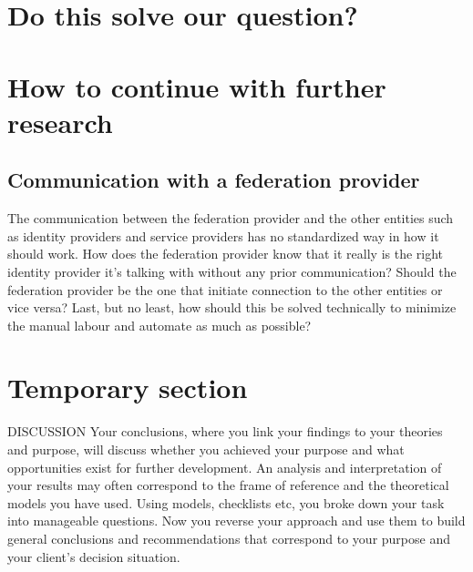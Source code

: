 \section{Do this solve our question?}

\section{How to continue with further research}
\subsection{Communication with a federation provider}
The communication between the federation provider and the other entities such as identity providers and service providers has no standardized way in how it should work.
How does the federation provider know that it really is the right identity provider it's talking with without any prior communication?
Should the federation provider be the one that initiate connection to the other entities or vice versa?
Last, but no least, how should this be solved technically to minimize the manual labour and automate as much as possible?

\section{Temporary section }
DISCUSSION Your conclusions, where you link your findings to your theories and purpose,
will discuss whether you achieved your purpose and what opportunities exist for further
development. An analysis and interpretation of your results may often correspond to the
frame of reference and the theoretical models you have used. Using models, checklists etc,
you broke down your task into manageable questions. Now you reverse your approach and
use them to build general conclusions and recommendations that correspond to your
purpose and your client's decision situation.


